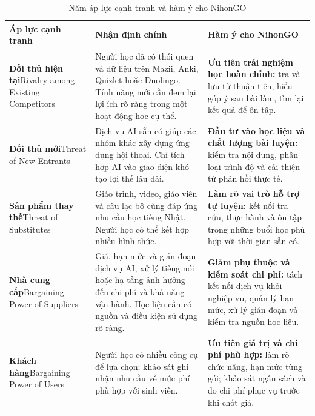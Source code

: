 \begin{table}[htbp]
\centering
\caption{Năm áp lực cạnh tranh và hàm ý cho NihonGO}
\label{tab:porter-five-forces}
\begingroup
{}
\fontsize{11}{14}\selectfont
\renewcommand{\arraystretch}{1.15}
\begin{tabular}{@{}>{\raggedright\arraybackslash}p{4cm}>{\raggedright\arraybackslash}p{5.6cm}>{\raggedright\arraybackslash}p{5.4cm}@{}}
\toprule
\textbf{Áp lực cạnh tranh} & \textbf{Nhận định chính} & \textbf{Hàm ý cho NihonGO} \\
\midrule
\textbf{Đối thủ hiện tại}\newline Rivalry among Existing Competitors
& Người học đã có thói quen và dữ liệu trên Mazii, Anki, Quizlet hoặc Duolingo. Tính năng mới cần đem lại lợi ích rõ ràng trong một hoạt động học cụ thể.
& \textbf{Ưu tiên trải nghiệm học hoàn chỉnh:} tra và lưu từ thuận tiện, hiểu góp ý sau bài làm, tìm lại kết quả để ôn tập. \\
\midrule
\textbf{Đối thủ mới}\newline Threat of New Entrants
& Dịch vụ AI sẵn có giúp các nhóm khác xây dựng ứng dụng hội thoại. Chỉ tích hợp AI vào giao diện khó tạo lợi thế lâu dài.
& \textbf{Đầu tư vào học liệu và chất lượng bài luyện:} kiểm tra nội dung, phân loại trình độ và cải thiện từ phản hồi thực tế. \\
\midrule
\textbf{Sản phẩm thay thế}\newline Threat of Substitutes
& Giáo trình, video, giáo viên và câu lạc bộ cùng đáp ứng nhu cầu học tiếng Nhật. Người học có thể kết hợp nhiều hình thức.
& \textbf{Làm rõ vai trò hỗ trợ tự luyện:} kết nối tra cứu, thực hành và ôn tập trong những buổi học phù hợp với thời gian sẵn có. \\
\midrule
\textbf{Nhà cung cấp}\newline Bargaining Power of Suppliers
& Giá, hạn mức và gián đoạn dịch vụ AI, xử lý tiếng nói hoặc hạ tầng ảnh hưởng đến chi phí và khả năng vận hành. Học liệu cần có nguồn và điều kiện sử dụng rõ ràng.
& \textbf{Giảm phụ thuộc và kiểm soát chi phí:} tách kết nối dịch vụ khỏi nghiệp vụ, quản lý hạn mức, xử lý gián đoạn và kiểm tra nguồn học liệu. \\
\midrule
\textbf{Khách hàng}\newline Bargaining Power of Users
& Người học có nhiều công cụ để lựa chọn; khảo sát ghi nhận nhu cầu về mức phí phù hợp với sinh viên.
& \textbf{Ưu tiên giá trị và chi phí phù hợp:} làm rõ chức năng, hạn mức từng gói; khảo sát ngân sách và đo chi phí phục vụ trước khi chốt giá. \\
\bottomrule
\end{tabular}
\endgroup
\end{table}

